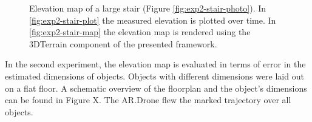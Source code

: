 \begin{figure}[htb!]
  \begin{center}

 \end{center}
  \caption{Elevation map of a large stair (Figure \ref{fig:exp2-stair-photo}). In \ref{fig:exp2-stair-plot} the measured elevation is plotted over time. In \ref{fig:exp2-stair-map} the elevation map is rendered using the 3DTerrain component of the presented framework.}
  \label{fig:exp2-results}
\end{figure}


In the second experiment, the elevation map is evaluated in terms of error in the estimated dimensions of objects.
Objects with different dimensions were laid out on a flat floor.
A schematic overview of the floorplan and the object's dimensions can be found in Figure X.
The AR.Drone flew the marked trajectory over all objects.